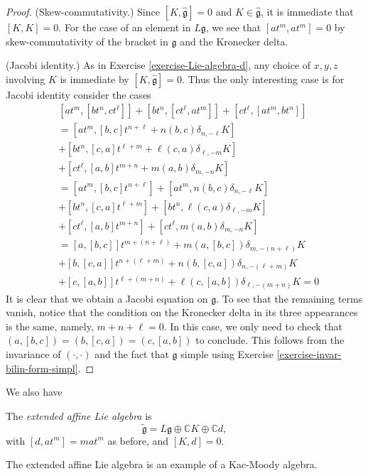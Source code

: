 \begin{proof}
(Skew-commutativity.)
Since $[K,\hat{\mathfrak{g}}]=0$ and $K \in
\hat{\mathfrak{g}}$,
it is immediate that $[K,K]=0$.
For the case of an element in
$L\mathfrak{g}$, we see that
$[at^m,at^m]=0$ by skew-commutativity of the
bracket in $\mathfrak{g}$
and the Kronecker delta.

(Jacobi identity.) As in Exercise
\ref{exercise-Lie-algebra-d},
any choice of $x,y,z$ involving $K$ is
immediate by $[K,\hat{\mathfrak{g}}]=0$.
Thus the only interesting case is
for Jacobi identity consider the cases
$$
\begin{aligned}
&
[at^m,[bt^n,ct^\ell]]+[bt^n,[ct^\ell,at^m]]+
[ct^\ell,[at^m,bt^n]]\\
&=[at^m,[b,c]t^{n+\ell}+n(b,c)\delta_{n,-
\ell}K]\\
&+[bt^n,[c,a]t^{\ell+m}+\ell(c,a)
\delta_{\ell,-m}K]\\
&+[ct^\ell,[a,b]t^{m+n}+m(a,b)\delta_{m,-n}K]
\\
&=[at^m,[b,c]t^{n+\ell}]+[at^m,n(b,c)
\delta_{n,-\ell}K]\\
&+[bt^n,[c,a]t^{\ell+m}]+[bt^n,\ell(c,a)
\delta_{\ell,-m}K]\\
&+[ct^\ell,[a,b]t^{m+n}]+[ct^\ell,m(a,b)
\delta_{m,-n}K]\\
&=[a,[b,c]]t^{m+(n+\ell)}+m(a,[b,c])
\delta_{m,-(n+\ell)}K\\
&+[b,[c,a]]t^{n+(\ell+m)}+n(b,[c,a])
\delta_{n,-(\ell+m)}K\\
&+[c,[a,b]]t^{\ell+(m+n)}+\ell(c,[a,b])
\delta_{\ell,-(m+n)}K=0
\end{aligned}
$$
It is clear that we obtain a Jacobi equation
on $\mathfrak{g}$. To see that the
remaining terms vanish, notice that the
condition on
the Kronecker delta in its three appearances
is the same,
namely, $m+n+\ell=0$. In this case, we only
need to check
that $(a,[b,c])=(b,[c,a])=(c,[a,b])$ to
conclude.
This follows from the invariance of
$(\cdot,\cdot)$
and the fact that $\mathfrak{g}$ simple using
Exercise
\ref{exercise-invar-bilin-form-simpl}.
\end{proof}

We also have
\begin{definition}
\label{definition-exten-affin-lie-algeb}
The {\it extended affine Lie algebra} is
$$
\tilde{\mathfrak{g}}=L\mathfrak{g} \oplus
\mathbb{C}K \oplus \mathbb{C}d,
$$
with $[d,at^m]=m a t^m$ as before, and
$[K,d]=0$.
\end{definition}

The extended affine Lie algebra is an example
of a Kac-Moody algebra.

